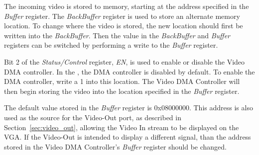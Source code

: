 The incoming video is stored to memory, starting at the address specified in the {\it Buffer} register. The 
{\it BackBuffer} register is used to store an alternate memory location. To change where the video is stored, 
the new location should first be written into the {\it BackBuffer}. Then the value in the {\it BackBuffer} and
{\it Buffer} registers can be switched by performing a write to the {\it Buffer} register. 

Bit 2 of the {\it Status/Control} register, {\it EN}, is used to enable or disable the Video DMA controller.
In the \systemName, the DMA controller is disabled by default. To enable the DMA controller, write a 
1 into this location. The Video DMA Controller will then begin storing the video into the location specified 
in the {\it Buffer} register.

The default value stored in the {\it Buffer} register is {\sf 0x08000000}. This address is also used as the 
source for the Video-Out port, as described in Section~\ref{sec:video_out}, allowing the Video In stream to be 
displayed on the VGA. If the Video-Out is intended to display a different signal, than the address stored in 
the Video DMA Controller's {\it Buffer} register should be changed. 